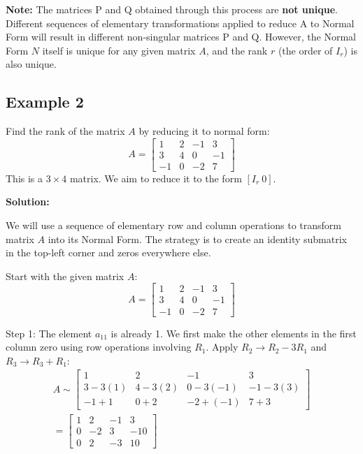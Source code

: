 \documentclass{article}
\begin{document}
\textbf{Note:}
The matrices P and Q obtained through this process are \textbf{not unique}. Different sequences of elementary transformations applied to reduce A to Normal Form will result in different non-singular matrices P and Q. However, the Normal Form $N$ itself is unique for any given matrix $A$, and the rank $r$ (the order of $I_r$) is also unique.

\subsection{Example 2}
Find the rank of the matrix $A$ by reducing it to normal form:
\[ A = \begin{bmatrix} 1 & 2 & -1 & 3 \\ 3 & 4 & 0 & -1 \\ -1 & 0 & -2 & 7 \end{bmatrix} \]
This is a $3 \times 4$ matrix. We aim to reduce it to the form $[I_r \ 0]$.

\textbf{Solution:}

We will use a sequence of elementary row and column operations to transform matrix $A$ into its Normal Form. The strategy is to create an identity submatrix in the top-left corner and zeros everywhere else.

Start with the given matrix $A$:
\[ A = \begin{bmatrix} 1 & 2 & -1 & 3 \\ 3 & 4 & 0 & -1 \\ -1 & 0 & -2 & 7 \end{bmatrix} \]

Step 1: The element $a_{11}$ is already 1. We first make the other elements in the first column zero using row operations involving $R_1$.
Apply $R_2 \to R_2 - 3R_1$ and $R_3 \to R_3 + R_1$:
\begin{align*} A \sim \begin{bmatrix} 1 & 2 & -1 & 3 \\ 3 - 3(1) & 4 - 3(2) & 0 - 3(-1) & -1 - 3(3) \\ -1 + 1 & 0 + 2 & -2 + (-1) & 7 + 3 \end{bmatrix} \\ = \begin{bmatrix} 1 & 2 & -1 & 3 \\ 0 & -2 & 3 & -10 \\ 0 & 2 & -3 & 10 \end{bmatrix}\end{align*}
\end{document}
